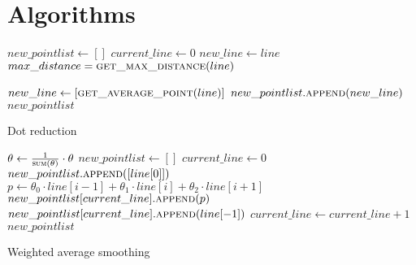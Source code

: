 

\appendix

{}	%
{}	%

\section{Algorithms}\label{appendix:algorithms}
\begin{algorithm}[ht]
  \begin{algorithmic}
            \State $new\_pointlist \gets []$
            \State $current\_line \gets 0$
                \State $new\_line \gets line$
                \State $max\_distance = \Call{get\_max\_distance}{line}$

                    \State $new\_line \gets [\Call{get\_average\_point}{line}]$
                \EndIf
                \State $new\_pointlist.\Call{append}{new\_line}$
            \EndFor
            \Return $new\_pointlist$
        \EndFunction
  \end{algorithmic}
  \caption{Dot reduction}
  \label{alg:dot-reduction}
\end{algorithm}


\begin{algorithm}[ht]
  \begin{algorithmic}
            \State $\theta \gets \frac{1}{\Call{sum}{\theta}} \cdot \theta$ 
            \State $new\_pointlist \gets []$
            \State $current\_line \gets 0$
                \State $new\_pointlist.\Call{append}{[line[0]]}$
                        \State $p \gets \theta_0 \cdot line[i-1] + \theta_1 \cdot line[i] + \theta_2 \cdot line[i+1]$
                        \State $new\_pointlist[current\_line].\Call{append}{p}$
                    \EndFor
                    \State $new\_pointlist[current\_line].\Call{append}{line[-1]}$
                \EndIf
                \State $current\_line \gets current\_line + 1$
            \EndFor
            \Return $new\_pointlist$
        \EndFunction
  \end{algorithmic}
  \caption{Weighted average smoothing}
  \label{alg:weighted-average-smoothing}
\end{algorithm}

